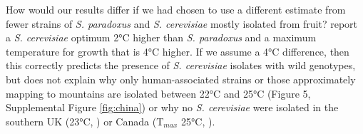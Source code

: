 \documentclass[12pt]{article}
\begin{document}
How would our results differ if we had chosen to use a different estimate \citep{salvado_temperature_2011} from fewer strains of \textit{S. paradoxus} and \textit{S. cerevisiae} mostly isolated from fruit? \citet{salvado_temperature_2011} report a \textit{S. cerevisiae} optimum 2\si{\degreeCelsius} higher than \textit{S. paradoxus} and a maximum temperature for growth that is 4\si{\degreeCelsius} higher. If we assume a 4\si{\degreeCelsius} difference, then this correctly predicts the presence of \textit{S. cerevisiae} isolates with wild genotypes, but does not explain why only human-associated strains or those approximately mapping to mountains are isolated between 22\si{\degreeCelsius} and 25\si{\degreeCelsius} (Figure 5, Supplemental Figure \ref{fig:china}) or why no \textit{S. cerevisiae} were isolated in the southern UK (23\si{\degreeCelsius}, \citealp{johnson_population_2004}) or Canada (T$_{max}$ 25\si{\degreeCelsius}, \citealp{charron_exploring_2014}).


\end{document}
